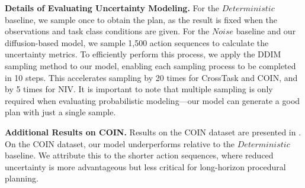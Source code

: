 \textbf{Details of Evaluating Uncertainty Modeling.} For the $Deterministic$ baseline, we sample once to obtain the plan, as the result is fixed when the observations and task class conditions are given. For the $Noise$ baseline and our diffusion-based model, we sample 1,500 action sequences to calculate the uncertainty metrics. To efficiently perform this process, we apply the DDIM~\citep{song2020denoising} sampling method to our model, enabling each sampling process to be completed in 10 steps. This accelerates sampling by 20 times for CrossTask and COIN, and by 5 times for NIV. It is important to note that multiple sampling is only required when evaluating probabilistic modeling—our model can generate a good plan with just a single sample.

\begin{table}
\vspace{-5mm}
\centering
\caption{The results of uncertain modeling on the COIN dataset.}
\label{tab:unc-COIN}
\vspace{-7mm}
\end{table}
\textbf{Additional Results on COIN.} Results on the COIN dataset are presented in . On the COIN dataset, our model underperforms relative to the $Deterministic$ baseline. We attribute this to the shorter action sequences, where reduced uncertainty is more advantageous but less critical for long-horizon procedural planning.

